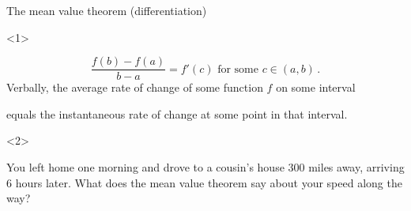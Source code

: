 \begin{frame}{The mean value theorem (differentiation)}

\begin{onlyenv}<1>


\[
\frac{f\left(b\right)-f\left(a\right)}{b-a}=f'\left(c\right)\mbox{ for some }c\in\left(a,b\right)\,.
\]
Verbally, the \alert{average rate of change} of some function $f$
on some interval 


equals the \alert{instantaneous rate of change} at some point in
that interval.

\end{onlyenv}



\begin{onlyenv}<2>

\begin{example}
You left home one morning and drove to a cousin's house $300$ miles
away, arriving $6$ hours later. What does the mean value theorem
say about your speed along the way?
\end{example}

\end{onlyenv}

\end{frame}

